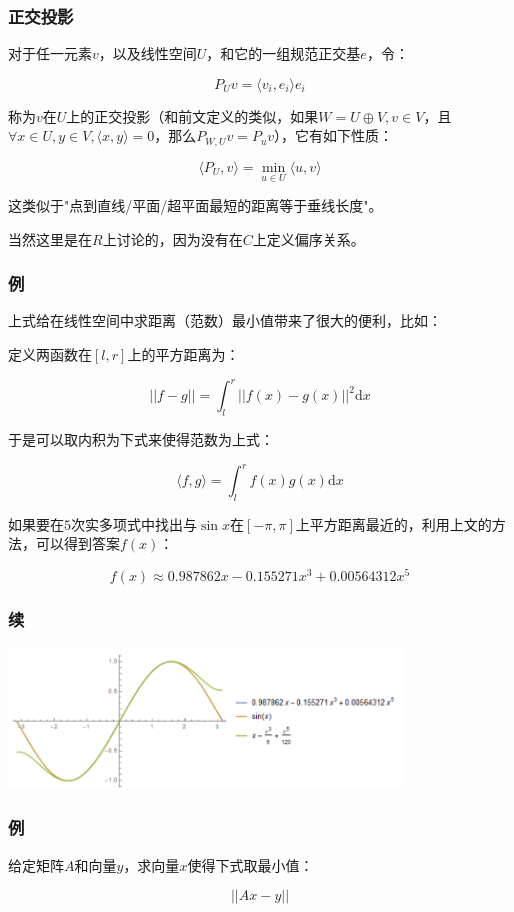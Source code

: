 \documentclass[10pt]{beamer}
\begin{document}
	\begin{frame}
		\frametitle{正交投影}
	
		对于任一元素$v$，以及线性空间$U$，和它的一组规范正交基$e$，令：

		$$
		P_Uv=\langle v_i,e_i\rangle e_i
		$$

		称为$v$在$U$上的正交投影（和前文定义的类似，如果$W=U\oplus V,v\in V$，且$\forall x\in U,y\in V,\langle x,y\rangle=0$，那么$P_{W,U}v=P_u v$），它有如下性质：

		$$
		\langle P_U,v\rangle=\min_{u\in U}\langle u,v\rangle
		$$

		这类似于"点到直线/平面/超平面最短的距离等于垂线长度"。
		
		当然这里是在$R$上讨论的，因为没有在$C$上定义偏序关系。
	
	\end{frame}
	\begin{frame}
		\frametitle{例}
	
		{\color{red}上式给在线性空间中求距离（范数）最小值带来了很大的便利}，比如：

		定义两函数在$[l,r]$上的平方距离为：

		$$
		||f-g||=\int_l^r ||f(x)-g(x)||^2\mathrm dx
		$$

		于是可以取内积为下式来使得范数为上式：

		$$
		\langle f,g\rangle=\int_l^r f(x)g(x)\mathrm dx
		$$

		如果要在$5$次实多项式中找出与$\sin x$在$[-\pi,\pi]$上平方距离最近的，利用上文的方法，可以得到答案$f(x)$：

		$$
		f(x)\approx 0.987862x-0.155271x^3+0.00564312x^5
		$$
	
	\end{frame}
	\begin{frame}
		\frametitle{续}
	
		\includegraphics[width=10.5cm]{1.png}
	
	\end{frame}
	\begin{frame}
		\frametitle{例}
		
		给定矩阵$A$和向量$y$，求向量$x$使得下式取最小值：

		$$
		||Ax-y||
		$$
	
	\end{frame}
\end{document}
